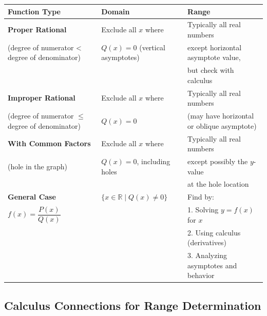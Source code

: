 \documentclass[../main-notes.tex]{subfile}
\begin{document}
\begin{table}[h]
\centering
\renewcommand{\arraystretch}{1.8}
\begin{tabular}{@{}>{\raggedright\arraybackslash}p{3.5cm}ll@{}}
\toprule
\textbf{Function Type} & \textbf{Domain} & \textbf{Range} \\ 
\midrule
\textbf{Proper Rational} & Exclude all \( x \) where & Typically all real numbers \\
(degree of numerator < degree of denominator) & \( Q(x) = 0 \) (vertical asymptotes) & except horizontal asymptote value, \\
& & but check with calculus \\
\addlinespace
\textbf{Improper Rational} & Exclude all \( x \) where & Typically all real numbers \\
(degree of numerator $\leq$ degree of denominator) & \( Q(x) = 0 \) & (may have horizontal or oblique asymptote) \\
\addlinespace
\textbf{With Common Factors} & Exclude all \( x \) where & Typically all real numbers \\
(hole in the graph) & \( Q(x) = 0 \), including holes & except possibly the \( y \)-value \\
& & at the hole location \\
\addlinespace
\textbf{General Case} & \( \{ x \in \mathbb{R} \mid Q(x) \neq 0 \} \) & Find by: \\
\( f(x) = \dfrac{P(x)}{Q(x)} \) & & 1. Solving \( y = f(x) \) for \( x \) \\
& & 2. Using calculus (derivatives) \\
& & 3. Analyzing asymptotes and behavior \\
\bottomrule
\end{tabular}
\end{table}

\subsection*{Calculus Connections for Range Determination}
\end{document}
